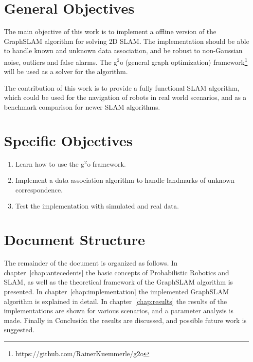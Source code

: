 \section{General Objectives}

The main objective of this work is to implement a offline version of the GraphSLAM algorithm for solving 2D SLAM. The implementation should be able to handle known and unknown data association, and be robust to non-Gaussian noise, outliers and false alarms. The g$^2$o (general graph optimization) framework\footnote{https://github.com/RainerKuemmerle/g2o} will be used as a solver for the algorithm.

The contribution of this work is to provide a fully functional SLAM algorithm, which could be used for the navigation of robots in real world scenarios, and as a benchmark comparison for newer SLAM algorithms.

\section{Specific Objectives}

\begin{enumerate}
    \item Learn how to use the g$^2$o framework.
    \item Implement a data association algorithm to handle landmarks of unknown correspondence.
    \item Test the implementation with simulated and real data. 
\end{enumerate}

\section{Document Structure}

The remainder of the document is organized as follows. In chapter~\ref{chap:antecedents} the basic concepts of Probabilistic Robotics and SLAM, as well as the theoretical framework of the GraphSLAM algorithm is presented. In chapter~\ref{chap:implementation} the implemented GraphSLAM algorithm is explained in detail. In chapter~\ref{chap:results} the results of the implementations are shown for various scenarios, and a parameter analysis is made. Finally in Conclusi\'on the results are discussed, and possible future work is suggested. 
